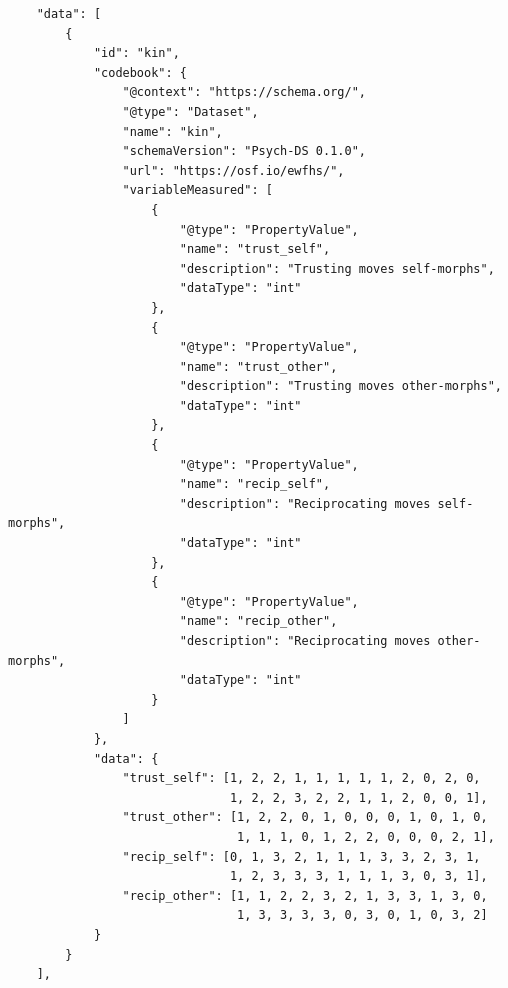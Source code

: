 \documentclass[
  english,
  doc,floatsintext]{apa6}
\begin{document}
\begin{tcolorbox}[colback=black!5!white,colframe=white!5!black,title=Box 6. The data component.]
\begin{verbatim}
    "data": [
        {
            "id": "kin",
            "codebook": {
                "@context": "https://schema.org/",
                "@type": "Dataset",
                "name": "kin",
                "schemaVersion": "Psych-DS 0.1.0",
                "url": "https://osf.io/ewfhs/",
                "variableMeasured": [
                    {
                        "@type": "PropertyValue",
                        "name": "trust_self",
                        "description": "Trusting moves self-morphs",
                        "dataType": "int"
                    },
                    {
                        "@type": "PropertyValue",
                        "name": "trust_other",
                        "description": "Trusting moves other-morphs",
                        "dataType": "int"
                    },
                    {
                        "@type": "PropertyValue",
                        "name": "recip_self",
                        "description": "Reciprocating moves self-morphs",
                        "dataType": "int"
                    },
                    {
                        "@type": "PropertyValue",
                        "name": "recip_other",
                        "description": "Reciprocating moves other-morphs",
                        "dataType": "int"
                    }
                ]
            },
            "data": {
                "trust_self": [1, 2, 2, 1, 1, 1, 1, 1, 2, 0, 2, 0, 
                               1, 2, 2, 3, 2, 2, 1, 1, 2, 0, 0, 1],
                "trust_other": [1, 2, 2, 0, 1, 0, 0, 0, 1, 0, 1, 0, 
                                1, 1, 1, 0, 1, 2, 2, 0, 0, 0, 2, 1],
                "recip_self": [0, 1, 3, 2, 1, 1, 1, 3, 3, 2, 3, 1, 
                               1, 2, 3, 3, 3, 1, 1, 1, 3, 0, 3, 1],
                "recip_other": [1, 1, 2, 2, 3, 2, 1, 3, 3, 1, 3, 0, 
                                1, 3, 3, 3, 3, 0, 3, 0, 1, 0, 3, 2]
            }
        }
    ],
\end{verbatim}
\end{tcolorbox}
\end{document}
